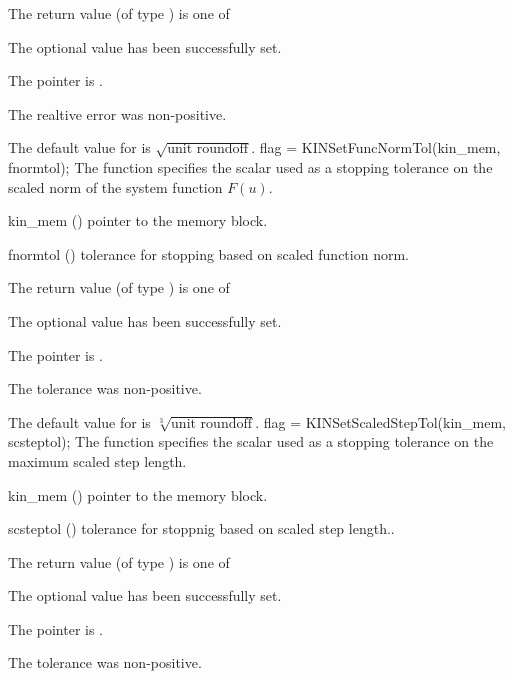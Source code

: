 {
  The return value  (of type ) is one of
  \begin{args}
  \item[\Id{KIN\_SUCCESS}] 
    The optional value has been successfully set.
  \item[\Id{KIN\_MEM\_NULL}]
    The  pointer is .
  \item[\Id{KIN\_ILL\_INPUT}]
    The realtive error was non-positive.
  \end{args}
}
{
  The default value for  is $\sqrt{\text{unit roundoff}}$.
}
{
flag = KINSetFuncNormTol(kin\_mem, fnormtol);
}
{
  The function  specifies the scalar used as a stopping
  tolerance on the scaled norm of the system function $F(u)$.
}
{
  \begin{args}[fnormtol]
  \item[kin\_mem] ()
    pointer to the {\kinsol} memory block.
  \item[fnormtol] ()
    tolerance for stopping based on scaled function norm.
  \end{args}
}
{
  The return value  (of type ) is one of
  \begin{args}
  \item[\Id{KIN\_SUCCESS}] 
    The optional value has been successfully set.
  \item[\Id{KIN\_MEM\_NULL}]
    The  pointer is .
  \item[\Id{KIN\_ILL\_INPUT}]
    The tolerance was non-positive.
  \end{args}
}
{
  The default value for  is $\sqrt[3]{\text{unit roundoff}}$.
}
{
flag = KINSetScaledStepTol(kin\_mem, scsteptol);
}
{
  The function  specifies the scalar used
  as a stopping tolerance on the maximum scaled step length.
}
{
  \begin{args}[scsteptol]
  \item[kin\_mem] ()
    pointer to the {\kinsol} memory block.
  \item[scsteptol] ()
    tolerance for stoppnig based on scaled step length.. 
  \end{args}
}
{
  The return value  (of type ) is one of
  \begin{args}
  \item[\Id{KIN\_SUCCESS}] 
    The optional value has been successfully set.
  \item[\Id{KIN\_MEM\_NULL}]
    The  pointer is .
  \item[\Id{KIN\_ILL\_INPUT}]
    The tolerance was non-positive.
  \end{args}
}
